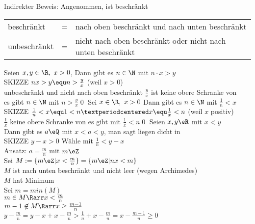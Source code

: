 Indirekter Beweis: Angenommen, \N{} ist beschränkt\\
\begin{tabular}{lcl}
beschränkt &=& nach oben beschränkt und nach unten beschränkt\\
unbeschränkt &=& nicht nach oben beschränkt oder nicht nach unten beschränkt
\end{tabular}
%
Seien $x,y\in\R,\ x>0$, Dann gibt es $n\in\N$ mit $n·x>y$\\
SKIZZE %
%
\bew
$nx>y \equ n>\frac{y}{x}$ (weil $x>0$)\\
\N{} unbeschränkt und nicht nach oben beschränkt \Rarr{} $\frac{y}{x}$ ist keine obere Schranke von \N\\
\Rarr{} es gibt $n\in\N$ mit $n>\frac{y}{x}$\qed
%
Sei $x\in\R,\ x>0$ Dann gibt es $n\in\N$ mit $\frac{1}{n}<x$\\
SKIZZE %
\bew
$\frac{1}{n}<x \equ 1<n·x \equ \frac{1}{x}<n$ (weil $x$ positiv)\\
$\frac{1}{x}$ keine obere Schranke von \N{} \Rarr{} es gibt \nN{} mit $\frac{1}{x}<n$\qed
%
\Satz
Seien $x,y\eR$ mit $x<y$\\
Dann gibt es $a\eQ$ mit $x<a<y$, man sagt \Q{} liegen dicht in \R\\
SKIZZE %
\bew
$y-x>0$ Wähle \nN{} mit $\frac{1}{n}<y-x$\\
Ansatz: $a=\frac{m}{n}$ mit $m\eZ$\\
Sei $M:=\{m\eZ|x<\frac{m}{n}\}=\{m\eZ|nx<m\}$\\
$M$ ist nach unten beschränkt und nicht leer (wegen Archimedes)\\
$M$ hat Minimum\\
Sei $m=min(M)$\\
$m\in M \Rarr x<\frac{m}{n}$\\
$m-1\not\in M \Rarr x\geq\frac{m-1}{n}$\\
$y-\frac{m}{n} =y-x+x-\frac{m}{n}>\frac{1}{n}+x-\frac{m}{n}=x-\frac{m-1}{n}\geq0$\\

